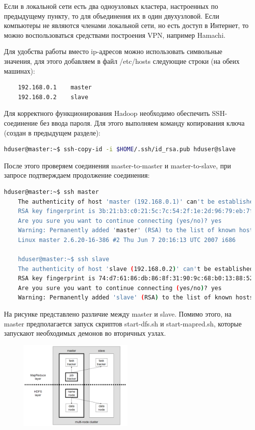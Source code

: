 \documentclass[12pt,a4paper]{extarticle} %
\begin{document}
    Если в локальной сети есть два одноузловых кластера, настроенных по предыдущему пункту, то для объединения их в один двухузловой. Если компьютеры не являются членами локальной сети, но есть доступ в Интернет, то можно воспользоваться средствами построения VPN, например Hamachi.
    
    Для удобства работы вместо ip-адресов можно использовать символьные значения, для этого добавляем в файл /etc/hosts следующие строки (на обеих машинах):
\begin{lstlisting}
    192.168.0.1    master
    192.168.0.2    slave
\end{lstlisting}

\noindent Для корректного функционирования Hadoop необходимо обеспечить SSH-соединение без ввода пароля. Для этого выполняем команду копирования ключа (создан в предыдущем разделе):
\begin{lstlisting}[language=sh]
    hduser@master:~$ ssh-copy-id -i $HOME/.ssh/id_rsa.pub hduser@slave
\end{lstlisting}

\noindent После этого проверяем соединения master-to-master и master-to-slave, при запросе подтверждаем продолжение соединения: 
\begin{lstlisting}[language=sh]
    hduser@master:~$ ssh master
    The authenticity of host 'master (192.168.0.1)' can't be established.
    RSA key fingerprint is 3b:21:b3:c0:21:5c:7c:54:2f:1e:2d:96:79:eb:7f:95.
    Are you sure you want to continue connecting (yes/no)? yes
    Warning: Permanently added 'master' (RSA) to the list of known hosts.
    Linux master 2.6.20-16-386 #2 Thu Jun 7 20:16:13 UTC 2007 i686
    
    hduser@master:~$ ssh slave
    The authenticity of host 'slave (192.168.0.2)' can't be established.
    RSA key fingerprint is 74:d7:61:86:db:86:8f:31:90:9c:68:b0:13:88:52:72.
    Are you sure you want to continue connecting (yes/no)? yes
    Warning: Permanently added 'slave' (RSA) to the list of known hosts.
\end{lstlisting}

\noindent На рисунке представлено различие между master и slave. Помимо этого, на master предполагается запуск скриптов start-dfs.sh и start-mapred.sh, которые запускают необходимых демонов во вторичных узлах.
\begin{figure}[h]
 \centering
    \includegraphics[width=0.5\textwidth]{images/two-node-cluster.png}
\end{figure}
\end{document}
